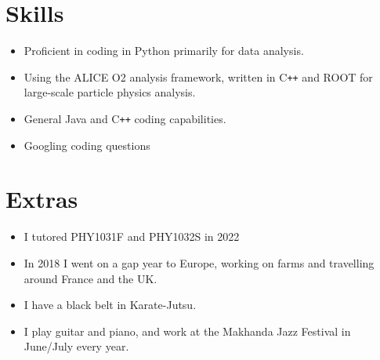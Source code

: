 \documentclass[11pt]{article}
\numberwithin{equation}{section}
\numberwithin{figure}{section}
\numberwithin{table}{section}
\begin{document}
\section*{Skills}
\begin{itemize}
    \item Proficient in coding in Python primarily for data analysis. 
    \item Using the ALICE O2 analysis framework, written in C\texttt{++} and ROOT for large-scale particle physics analysis.
    \item General Java and C\texttt{++} coding capabilities.
    \item Googling coding questions
\end{itemize}

\section*{Extras}
\begin{itemize}
    \item I tutored PHY1031F and PHY1032S in 2022
    \item In 2018 I went on a gap year to Europe, working on farms and travelling around France and the UK.
    \item I have a black belt in Karate-Jutsu.
    \item I play guitar and piano, and work at the Makhanda Jazz Festival in June/July every year.
\end{itemize}
\end{document}
